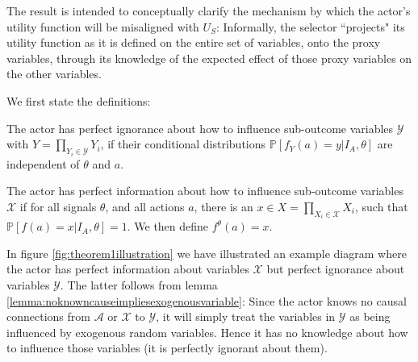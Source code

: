 The result is intended to conceptually clarify the mechanism by which the actor's utility function will be misaligned with $U_S$: Informally, the selector ``projects" its utility function as it is defined on the entire set of variables, onto the proxy variables, through its knowledge of the expected effect of those proxy variables on the other variables.

We first state the definitions:

\begin{definition}
	The actor has perfect ignorance about how to influence sub-outcome variables $\mathcal Y$ with $Y=\prod_{Y_i\in\mathcal Y}Y_i$, if their conditional distributions $\mathbb P[f_Y(a)=y|I_A,\theta]$ are independent of $\theta$ and $a$. 
\end{definition}

\begin{definition}\label{definition:perfectinformation}
	The actor has perfect information about how to influence sub-outcome variables $\mathcal X$ if for all signals $\theta$, and all actions $a$, there is an $x\in X=\prod_{X_i\in\mathcal X}X_i$, such that $\mathbb P[f(a)=x|I_A,\theta]=1$. We then define $f^\theta(a)=x$.
\end{definition}

In figure \ref{fig:theorem1illustration} we have illustrated an example diagram where the actor has perfect information about variables $\mathcal X$ but perfect ignorance about variables $\mathcal Y$. The latter follows from lemma \ref{lemma:noknowncauseimpliesexogenousvariable}: Since the actor knows no causal connections from $\mathcal A$ or $\mathcal X$ to $\mathcal Y$, it will simply treat the variables in $\mathcal Y$ as being influenced by exogenous random variables. Hence it has no knowledge about how to influence those variables (it is perfectly ignorant about them). 

